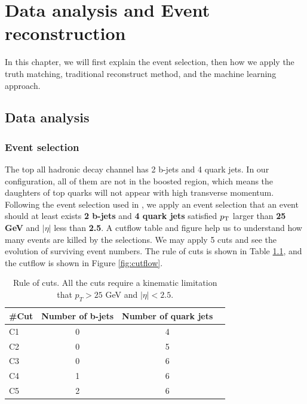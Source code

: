 \chapter{Data analysis and Event reconstruction}\label{section:Reconstruction}

In this chapter, we will first explain the event selection, then how we apply the truth matching, traditional reconstruct method, and the machine learning approach.

\section{Data analysis}\label{sec:Data analysis}

\subsection{Event selection}\label{subsec:Event selection}
The top all hadronic decay channel has 2 b-jets and 4 quark jets. In our configuration, all of them are not in the boosted region, which means the daughters of top quarks will not appear with high transverse momentum. Following the event selection used in \cite{Mccarthy:2015ucy},  we apply an event selection that an event should at least exists \textbf{2 b-jets} and \textbf{4 quark jets} satisfied $p_{\rm T}$ larger than \textbf{25 GeV} and $|\eta|$ less than \textbf{2.5}. A cutflow table and figure help us to understand how many events are killed by the selections. We may apply 5 cuts and see the evolution of surviving event numbers. The rule of cuts is shown in Table \ref{table:cuts}, and the cutflow is shown in Figure \ref{fig:cutflow}.
\\
\begin{center}
	\begin{table}[h]
		\begin{tabular}{p{} c c c }
			\cline{1-3}
			\#Cut    & Number of b-jets & Number of quark jets  \\
			\hline
			C1      &   0  & 4    \\
			C2      &   0  & 5    \\
			C3      &   0  & 6    \\
			C4      &   1  & 6    \\
			C5      &   2  & 6    \\
			\hline
		\end{tabular}
		\caption{Rule of cuts. All the cuts require a kinematic limitation that $p_{T} > 25$ GeV and $|\eta|<2.5$.}
		\label{table:cuts}
	\end{table}
\end{center}
